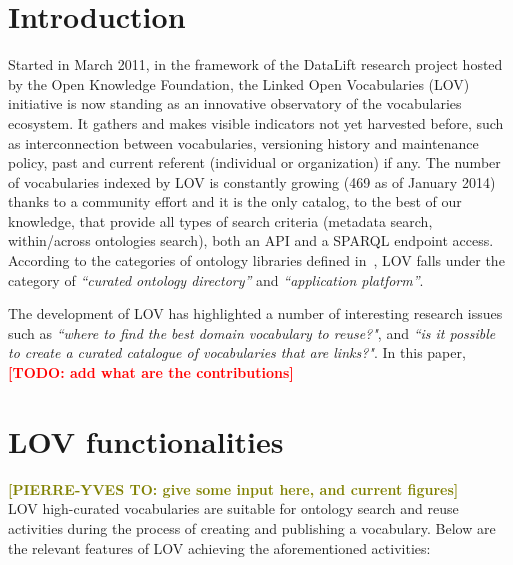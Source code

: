 \documentclass{iosart2c}
\newcommand{\TODO}[1]{\textcolor{red}{\textbf{[TODO:#1]}}}
\newcommand{\py}[1]{\textcolor{olive}{\textbf{[PIERRE-YVES TO:#1]}}}
\begin{document}
\section{Introduction}
Started in March 2011, in the framework of the DataLift research project \cite{scharffe_2012} hosted by the Open Knowledge Foundation, the Linked Open Vocabularies (LOV) initiative is now standing as an innovative observatory of the vocabularies ecosystem. It gathers and makes visible indicators not yet harvested before, such as interconnection between vocabularies, versioning history and maintenance policy, past and current referent (individual or organization) if any. The number of vocabularies indexed by LOV is constantly growing (469 as of January 2014) thanks to a community effort and it is the only catalog, to the best of our knowledge, that provide all types of search criteria (metadata search, within/across ontologies search), both an API and a SPARQL endpoint access. According to the categories of ontology libraries defined in~\cite{AquinJoWS12}, LOV falls under the category of \textit{``curated ontology directory''}  and \textit{``application platform''}.

The development of LOV has highlighted a number of interesting research issues such as \textit{``where to find the best domain vocabulary to reuse?"}, and \textit{``is it possible to create a curated catalogue of vocabularies that are links?"}. 
In this paper, \TODO{ add what are the contributions}


\section{LOV functionalities}
\label{sec:about}

\py{ give some input here, and current figures}\\

LOV high-curated vocabularies are suitable for ontology search and reuse activities during the process of creating and publishing a vocabulary. Below are the relevant features of LOV achieving the aforementioned activities:
\end{document}
